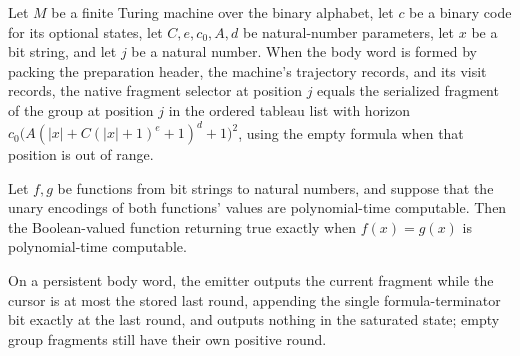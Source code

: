 \begin{lemma}
\label{Complexity.clA5Fragment_exact}
\leanok
{}
Let $M$ be a finite Turing machine over the binary alphabet, let $c$ be a binary code
for its optional states, let $C,e,c_0,A,d$ be natural-number parameters, let $x$ be a
bit string, and let $j$ be a natural number. When the body word is formed by packing the
preparation header, the machine's trajectory records, and its visit records, the native
fragment selector at position $j$ equals the serialized fragment of the group at
position $j$ in the ordered tableau list with horizon
$c_0\bigl(A(|x|+C(|x|+1)^e+1)^d+1\bigr)^2$, using the empty formula when that position
is out of range.
\end{lemma}

\begin{lemma}
\label{Complexity.clA5Eq_native}
\leanok
{}
Let $f,g$ be functions from bit strings to natural numbers, and suppose that the unary
encodings of both functions' values are polynomial-time computable. Then the
Boolean-valued function returning true exactly when $f(x)=g(x)$ is polynomial-time
computable.
\end{lemma}

\begin{definition}
\label{Complexity.clA5Emit}
\leanok
{}
On a persistent body word, the emitter outputs the current fragment while the cursor is at most the stored last round, appending the single formula-terminator bit exactly at the last round, and outputs nothing in the saturated state; empty group fragments still have their own positive round.
\end{definition}

